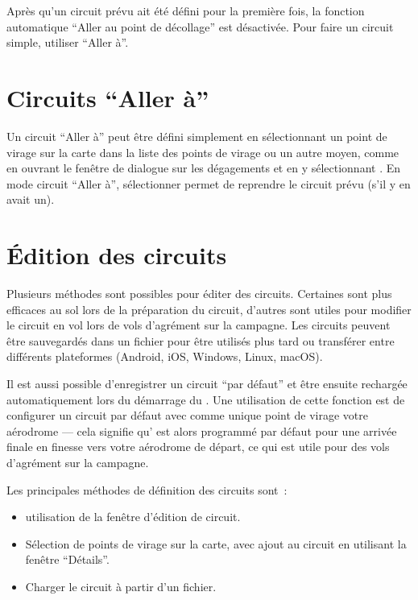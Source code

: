 Après qu'un circuit prévu ait été défini pour la première fois, la fonction automatique ``Aller au point de décollage''
est désactivée. Pour faire un circuit simple, utiliser ``Aller à''.

\section{Circuits ``Aller à''}

Un circuit ``Aller à'' peut être défini simplement en sélectionnant un point de virage sur la carte
dans la liste des points de virage ou un autre moyen, comme en ouvrant le fenêtre de dialogue sur les dégagements
et en y sélectionnant . En mode circuit ``Aller à'', sélectionner
\blink{}
permet de reprendre le circuit prévu (s’il y en avait un).

\section{Édition des circuits}

Plusieurs méthodes sont possibles pour éditer des circuits. Certaines sont plus efficaces au sol lors
de la préparation du circuit, d'autres sont utiles pour modifier le circuit en vol lors
de vols d'agrément sur la campagne. Les circuits peuvent être sauvegardés dans
un fichier pour être utilisés plus tard ou transférer entre différents plateformes \xc{}
(Android, iOS, Windows, Linux, macOS\textellipsis).

\tip{} Il est aussi possible d'enregistrer un circuit ``par défaut'' et être ensuite rechargée
automatiquement lors du démarrage du \xc. Une utilisation de cette fonction est de
configurer un circuit par défaut avec comme unique point de virage votre aérodrome --- cela signifie
qu'\xc{} est alors programmé par défaut pour une arrivée finale en finesse vers votre aérodrome de départ, ce qui
est utile pour des vols d'agrément sur la campagne.

Les principales méthodes de définition des circuits sont~:
\begin{itemize}
\item utilisation de la fenêtre d'édition de circuit.
\item Sélection de points de virage sur la carte, avec ajout au circuit en utilisant la fenêtre ``Détails''.
\item Charger le circuit à partir d'un fichier.
\end{itemize}


